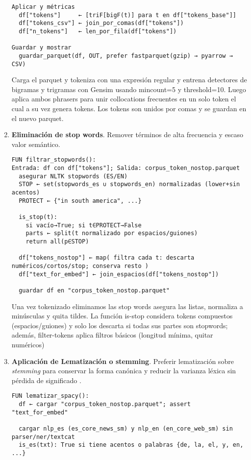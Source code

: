 \begin{enumerate}
\begin{verbatim}
Aplicar y métricas
  df["tokens"]     ← [triF[bigF(t)] para t en df["tokens_base"]]
  df["tokens_csv"] ← join_por_comas(df["tokens"])
  df["n_tokens"]   ← len_por_fila(df["tokens"])

Guardar y mostrar
  guardar_parquet(df, OUT, prefer fastparquet(gzip) → pyarrow → CSV)
\end{verbatim}
Carga el parquet y tokeniza con una expresión regular y entrena detectores de bigramas y trigramas con Gensim usando mincount=5 y threshold=10. 
Luego aplica ambos phrasers para unir collocations frecuentes en un solo token el cual a su vez genera tokens. Los tokens son unidos por comas y se guardan en el nuevo parquet.

    \item \textbf{Eliminación de stop words}. Remover términos de alta frecuencia y escaso valor semántico.
\begin{verbatim}
FUN filtrar_stopwords():
Entrada: df con df["tokens"]; Salida: corpus_token_nostop.parquet
  asegurar NLTK stopwords (ES/EN)
  STOP ← set(stopwords_es ∪ stopwords_en) normalizadas (lower+sin acentos)
  PROTECT ← {"in south america", ...}

  is_stop(t):
    si vacío→True; si t∈PROTECT→False
    parts ← split(t normalizado por espacios/guiones)
    return all(p∈STOP)  

  df["tokens_nostop"] ← map( filtra cada t: descarta numéricos/cortos/stop; conserva resto )
  df["text_for_embed"] ← join_espacios(df["tokens_nostop"])

  guardar df en "corpus_token_nostop.parquet"
\end{verbatim}
Una vez tokenizado eliminamos las stop words asegura las listas, normaliza a minúsculas y quita tildes.
La función is-stop considera tokens compuestos (espacios/guiones) y solo los descarta si todas sus partes 
son stopwords; además, filter-tokens aplica filtros básicos (longitud mínima, quitar numéricos)

    \item \textbf{Aplicación de Lematización o stemming}. Preferir lematización sobre \textit{stemming} para conservar la forma canónica y reducir 
    la varianza léxica sin pérdida de significado \parencite{tabassum2020}.
\begin{verbatim}
FUN lematizar_spacy():
  df ← cargar "corpus_token_nostop.parquet"; assert "text_for_embed"

  cargar nlp_es (es_core_news_sm) y nlp_en (en_core_web_sm) sin parser/ner/textcat
  is_es(txt): True si tiene acentos o palabras {de, la, el, y, en, ...}


\end{verbatim}
\end{enumerate}
